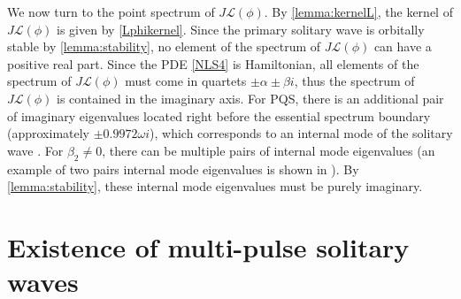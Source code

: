 \documentclass[12pt]{elsarticle}
\def\calL{{\mathcal L}}
\begin{document}
We now turn to the point spectrum of $J \calL(\phi)$. By \cref{lemma:kernelL}, the kernel of $J \calL(\phi)$ is given by \cref{Lphikernel}. Since the primary solitary wave is orbitally stable by \cref{lemma:stability}, no element of the spectrum of $J \calL(\phi)$ can have a positive real part. Since the PDE \cref{NLS4} is Hamiltonian, all elements of the spectrum of $J \calL(\phi)$ must come in quartets $\pm \alpha \pm \beta i$, thus the spectrum of $J \calL(\phi)$ is contained in the imaginary axis. For PQS, there is an additional pair of imaginary eigenvalues located right before the essential spectrum boundary (approximately $\pm 0.9972 \omega i$), which corresponds to an internal mode of the solitary wave \cite{Tam2019}. For $\beta_2 \neq 0$, there can be multiple pairs of internal mode eigenvalues (an example of two pairs internal mode eigenvalues is shown in \cite[Figure 9]{Tam2020}). By \cref{lemma:stability}, these internal mode eigenvalues must be purely imaginary.

\section{Existence of multi-pulse solitary waves}
\end{document}
